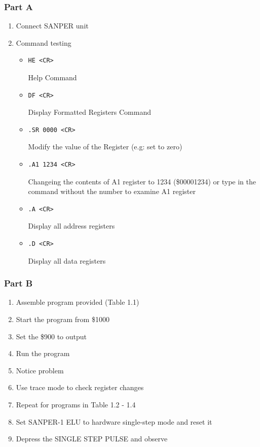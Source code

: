 \documentclass{article}
\begin{document}
	\subsubsection{Part A}
		\begin{enumerate}[label=(\alph*)]
		\item Connect SANPER unit
		\item Command testing
			\begin{itemize}
				\item \begin{verbatim}HE <CR>\end{verbatim}  Help Command
				\item \begin{verbatim}DF <CR>\end{verbatim}  Display Formatted Registers Command
				\item \begin{verbatim}.SR 0000 <CR>\end{verbatim}  Modify the value of the Register (e.g: set to zero)
				\item \begin{verbatim}.A1 1234 <CR>\end{verbatim}  Changeing the contents of A1 register to 1234 (\$00001234) or type in the command without the number to examine A1 register
				\item \begin{verbatim}.A <CR>\end{verbatim}  Display all address registers
				\item \begin{verbatim}.D <CR>\end{verbatim}  Display all data registers
			\end{itemize}
		\end{enumerate}
	\subsubsection{Part B}
		\begin{enumerate}[label=(\alph*)]
			\item Assemble program provided (Table 1.1)
			\item Start the program from \$1000
			\item Set the \$900 to output
			\item Run the program
			\item Notice problem
			\item Use trace mode to check register changes
			\item Repeat for programs in Table 1.2 - 1.4
			\item Set SANPER-1 ELU to hardware single-step mode and reset it
			\item Depress the SINGLE STEP PULSE and observe
		\end{enumerate}
		
\end{document}
